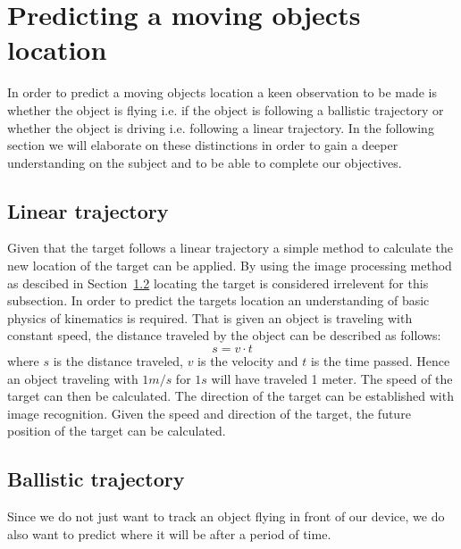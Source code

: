 \section{Predicting a moving objects location}
In order to predict a moving objects location a keen observation to be made is whether the object is flying i.e{.} if the object is following a ballistic trajectory or whether the object is driving i.e{.} following a linear trajectory. 
In the following section we will elaborate on these distinctions in order to gain a deeper understanding on the subject and to be able to complete our objectives. 
\subsection{Linear trajectory}
Given that the target follows a linear trajectory a simple method to calculate the new location of the target can be applied. 
By using the image processing method as descibed in Section~\ref{} locating the target is considered irrelevent for this subsection. 
In order to predict the targets location an understanding of basic physics of kinematics is required. 
That is given an object is traveling with constant speed, the distance traveled by the object can be described as follows:
\begin{equation}
s = v \cdot t
\end{equation}
where $ s $ is the distance traveled, $ v $ is the velocity and $ t $ is the time passed.
Hence an object traveling with $ 1 m/s $ for $ 1 s $ will have traveled 1 meter. 
The speed of the target can then be calculated.
The direction of the target can be established with image recognition.
Given the speed and direction of the target, the future position of the target can be calculated.


\subsection{Ballistic trajectory}
Since we do not just want to track an object flying in front of our device, we do also want to predict where it will be after a period of time. 
